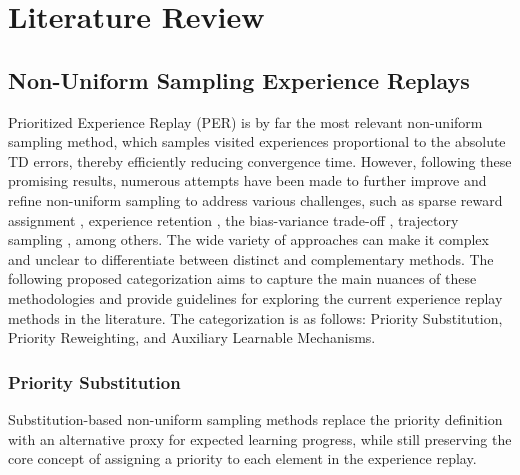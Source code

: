 
\chapter{Literature Review}

\section{Non-Uniform Sampling Experience Replays}

Prioritized Experience Replay (PER) \cite{schaul2015prioritized} is by far the most relevant non-uniform sampling method, which samples visited experiences proportional to the absolute TD errors, thereby efficiently reducing convergence time. However, following these promising results, numerous attempts have been made to further improve and refine non-uniform sampling to address various challenges, such as sparse reward assignment \cite{andrychowicz2017hindsight, dai2021diversity}, experience retention \cite{de2018experience}, the bias-variance trade-off \cite{fedus2020revisiting, hessel2018rainbow, sutton1988learning, sutton2018reinforcement}, trajectory sampling \cite{dai2021diversity, liu2023prioritized}, among others. The wide variety of approaches can make it complex and unclear to differentiate between distinct and complementary methods. The following proposed categorization aims to capture the main nuances of these methodologies and provide guidelines for exploring the current experience replay methods in the literature. The categorization is as follows: Priority Substitution, Priority Reweighting, and Auxiliary Learnable Mechanisms.

\subsection{Priority Substitution}


Substitution-based non-uniform sampling methods replace the priority definition with an alternative proxy for expected learning progress, while still preserving the core concept of assigning a priority to each element in the experience replay.
 
